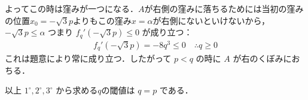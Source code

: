 \documentclass[../../main.tex]{subfiles}
\begin{document}
よってこの時は窪みが一つになる．$A$が右側の窪みに落ちるためには当初の窪みの位置$x_0=-\sqrt{3}p$よりもこの窪み$x=\alpha$が右側にないといけないから，$-\sqrt{3}p \le \alpha$ つまり $f_q'(-\sqrt{3}p) \le 0$ が成り立つ：
\begin{align}
  f_q'(-\sqrt{3}p) = -8q^3 \le 0 \quad \therefore q \ge 0
\end{align}
これは題意により常に成り立つ．したがって $p < q$ の時に $A$ が右のくぼみにおちる．
\casesend

以上 $1^\circ, 2^\circ, 3^{\circ}$ から求める$q$の閾値は $ q = p$ である．

\newpage
\end{document}
